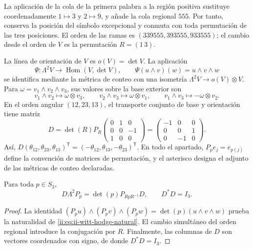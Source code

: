 La aplicación de la cola de la primera palabra a la región positiva
sustituye coordenadamente \(1\mapsto3\) y \(2\mapsto9\), y añade
la cola regional \(555\). Por tanto, conserva la posición del símbolo
excepcional y conmuta con toda permutación de las tres posiciones. El orden
de las ramas es \((339555,393555,933555)\); el cambio desde el orden de
\(V\) es la permutación \(R=(1\,3)\).

La línea de orientación de \(V\) es \(o(V)=\det V\). La aplicación
\begin{equation}
 \Psi:\Lambda^2V\longrightarrow\operatorname{Hom}(V,\det V),
 \qquad \Psi(u\wedge v)(w)=u\wedge v\wedge w
 \label{ii:eq:ii-witt-hodge-natural}
\end{equation}
se identifica mediante la métrica de conteo con una isometría
\(\Lambda^2V\to o(V)\otimes V\). Para
\(\omega=v_1\wedge v_2\wedge v_3\), sus valores sobre la base exterior
son
\[
 v_1\wedge v_2\mapsto\omega\otimes v_3,
 \qquad v_2\wedge v_3\mapsto\omega\otimes v_1,
 \qquad v_1\wedge v_3\mapsto-\omega\otimes v_2.
\]
En el orden angular \((12,23,13)\), el transporte conjunto de base y
orientación tiene matriz
\begin{equation}
 D=\det(R)P_R
 \begin{pmatrix}0&1&0\\0&0&-1\\1&0&0\end{pmatrix}
 =\begin{pmatrix}-1&0&0\\0&0&1\\0&-1&0\end{pmatrix}.
 \label{ii:eq:ii-witt-orientation-D}
\end{equation}
Así,
\(D(\theta_{12},\theta_{23},\theta_{13})^{\mathsf T}
=(-\theta_{12},\theta_{13},-\theta_{23})^{\mathsf T}\).
En todo el apartado, \(P_p e_j=e_{p(j)}\) define la convención de
matrices de permutación, y el asterisco designa el adjunto de las métricas
de conteo declaradas.

\begin{proposition}
\label{ii:prop:ii-witt-D-natural}
Para toda \(p\in S_3\),
\[
 D\Lambda^2P_p=\det(p)P_{RpR^{-1}}D,
 \qquad D^*D=I_3.
\]
\end{proposition}
\begin{proof}
La identidad
\((P_pu)\wedge(P_pv)\wedge(P_pw)=\det(p)(u\wedge v\wedge w)\)
prueba la naturalidad de \eqref{ii:eq:ii-witt-hodge-natural}. El cambio
simultáneo del orden regional introduce la conjugación por \(R\).
Finalmente, las columnas de \(D\) son vectores coordenados con signo,
de donde \(D^*D=I_3\).
\end{proof}

